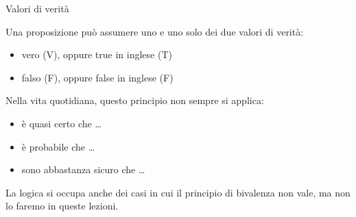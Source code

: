 \documentclass[10pt,dvipsnames]{beamer}
\begin{document}
\begin{frame}{Valori di verità}
	\begin{definition}
		Una proposizione può assumere uno e uno solo dei due \alert{valori di verità}:
		\begin{itemize}
			\item vero (\alert{V}), oppure true in inglese (\alert{T})
			\item falso (\alert{F}), oppure false in inglese (\alert{F})
		\end{itemize}
	\end{definition}
	Nella vita quotidiana, questo principio non sempre si applica:
	\begin{itemize}
		\item è quasi certo che \ldots
		\item è probabile che \ldots
		\item sono abbastanza sicuro che \ldots
	\end{itemize}
	La logica si occupa anche dei casi in cui il principio di bivalenza non vale, ma non lo faremo in queste lezioni.
\end{frame}

%
%
%
\end{document}
